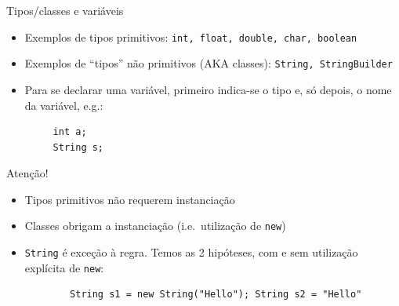\documentclass[portuguese, aspectratio=169, xcolor=table]{beamer}
\begin{document}
\begin{frame}[fragile]{Tipos/classes e variáveis}
\begin{itemize}
    \item Exemplos de tipos primitivos: \texttt{int, float, double, char, boolean}
    \item Exemplos de ``tipos'' não primitivos (AKA classes): \texttt{String, StringBuilder}
    \item Para se declarar uma variável, primeiro indica-se o tipo e, só depois, o nome da variável, e.g.:
    \begin{verbatim}
     int a;
     String s;
    \end{verbatim}
\end{itemize}

\begin{alertblock}{Atenção!}
\begin{itemize}
    \item Tipos primitivos não requerem instanciação
    \item Classes obrigam a instanciação (i.e.\ utilização de \texttt{new})
    \item \texttt{String} é exceção à regra. Temos as 2 hipóteses, com e sem utilização explícita de \texttt{new}:
    \begin{verbatim}
        String s1 = new String("Hello"); String s2 = "Hello"
    \end{verbatim}
\end{itemize}
\end{alertblock}
\end{frame}
\end{document}
